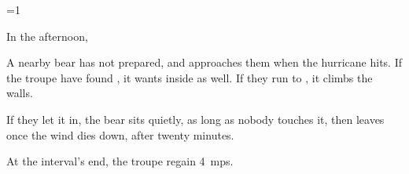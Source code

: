 
\ifnum\value{temperature}=1

  In the afternoon,

  A nearby bear has not prepared, and approaches them when the \gls{hurricane} hits.
  If the troupe have found , it wants inside as well.
  If they run to , it climbs the walls.

  If they let it in, the bear sits quietly, as long as nobody touches it, then leaves once the wind dies down, after twenty minutes.

  At the \gls{interval}'s end, the troupe regain 4~\glspl{mp}.

\fi


